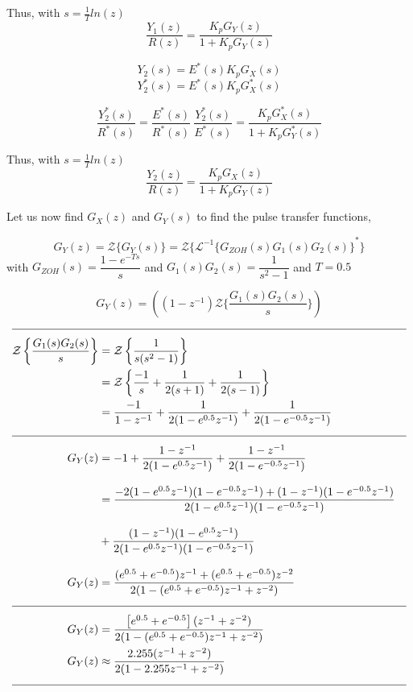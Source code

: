 \documentclass[a4paper,12pt]{article}
\begin{document}
\begin{enumerate}
\begin{enumerate}
		Thus, with $s=\frac{1}{T}ln(z)$
		$$\boxed{ \frac{Y_1(z)}{R(z)} = \frac{K_p G_Y(z)}{1+K_pG_Y(z)} }$$
		
		$$ 	Y_2(s) = E^*(s) K_p G_X(s)  $$
		$$  Y_2^*(s) = E^*(s) K_p G_X^*(s) $$
		
		$$ \frac{Y_2^*(s)}{R^*(s)} = \frac{E^*(s)}{R^*(s)} \ \frac{Y_2^*(s)}{E^*(s)} = \frac{K_p G_X^*(s)}{1+K_pG_Y^*(s)}  $$
		
		Thus, with $s=\frac{1}{T}ln(z)$
		$$\boxed{ \frac{Y_2(z)}{R(z)} = \frac{K_p G_X(z)}{1+K_pG_Y(z)} }$$
		
		
		
		\newpage
		
		Let us now find $G_X(z)$ and $G_Y(s)$ to find the pulse transfer functions,
		
		$$ G_Y(z)=\mathcal{Z}\{G_Y(s)\}  =\mathcal{Z}\{ {\mathcal{L}^{-1}\{G_{ZOH}(s)G_1(s)G_2(s)\}}^*	\}$$
		with $G_{ZOH}(s)=\dfrac{1-e^{-Ts}}{s}$ and $G_1(s)G_2(s)=\dfrac{1}{s^2-1}$ and $\boxed{T=0.5}$
		
			$$\boxed { G_Y(z)=\left((1-z^{-1}) \mathcal{Z}\{ \frac{G_1(s)G_2(s)}{s} \}\right) }$$ 
			\begin{equation*}
				\begin{split}\\[-0.3cm]  \hline \\[-0.3cm] 
		 			\mathcal{Z}\left\{ \frac{G_1(s)G_2(s)}{s} \right\}&=\mathcal{Z}\left\{ \frac{1}{s(s^2-1)} \right\} \\
					&= \mathcal{Z} \left\{ \frac{-1}{s}+\frac{1}{2(s+1)}+\frac{1}{2(s-1)} \right\}\\
					&=\frac{-1}{1-z^{-1}}+ \frac{1}{2(1-e^{0.5}z^{-1})}+ \frac{1}{2(1-e^{-0.5}z^{-1})} \\[0.3cm]  \hline 
					\\[-0.3cm] 
					G_Y(z)&=-1+ \frac{1-z^{-1}}{2(1-e^{0.5}z^{-1})}+ \frac{1-z^{-1}}{2(1-e^{-0.5}z^{-1})} \\[0.3cm]
					&=\frac{-2(1-e^{0.5}z^{-1})(1-e^{-0.5}z^{-1})+(1-z^{-1})(1-e^{-0.5}z^{-1})}{2(1-e^{0.5}z^{-1})(1-e^{-0.5}z^{-1})} \\[0.3cm]
					& +\frac{(1-z^{-1})(1-e^{0.5}z^{-1})}{2(1-e^{0.5}z^{-1})(1-e^{-0.5}z^{-1})} \\[0.3cm]
					G_Y(z)&=\frac{(e^{0.5}+e^{-0.5})z^{-1}+(e^{0.5}+e^{-0.5})z^{-2}}{2(1-(e^{0.5}+e^{-0.5})z^{-1}+z^{-2})} 
					\\[0.3cm]  \hline \\[-0.3cm]
					G_Y(z)&=\frac{\left[e^{0.5}+e^{-0.5}\right](z^{-1}+z^{-2})}{2(1-(e^{0.5}+e^{-0.5})z^{-1}+z^{-2})}  \\
					G_Y(z)&\approx \frac{2.255(z^{-1}+z^{-2})}{2(1-2.255z^{-1}+z^{-2})}
					\\[0.3cm]  \hline \\[-0.3cm]
				\end{split} 
			\end{equation*}
			

\end{enumerate}
\end{enumerate}
\end{document}
